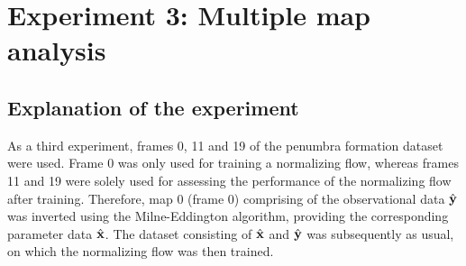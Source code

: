 \documentclass[a4paper,11pt]{report}
\def\fc#1{{\color{black}{#1}}} %
\begin{document}
\FloatBarrier


\FloatBarrier

\section{Experiment 3: Multiple map analysis}
\subsection{Explanation of the experiment}\label{sec:explanation_experiment_3}
As a third experiment, frames 0, 11 and 19 of the penumbra formation dataset were used. Frame 0 was only used for training a normalizing flow, whereas frames 11 and 19 were solely used for assessing the performance of the normalizing flow after training. Therefore, map 0 (frame 0) comprising of the observational data $\hat{\boldsymbol{\mathbf{y}}}$ was inverted using the Milne-Eddington algorithm, providing the corresponding parameter data $\hat{\boldsymbol{\mathbf{x}}}$. The dataset consisting of $\hat{\boldsymbol{\mathbf{x}}}$ and $\hat{\boldsymbol{\mathbf{y}}}$ was subsequently \fc{split into train and test splits} as usual, on which the normalizing flow was then trained.
\end{document}

